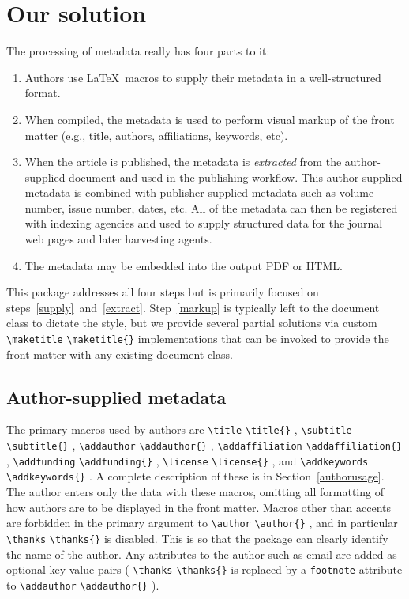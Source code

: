 \documentclass{article}
\newcommand{\cmd}[2][]{%
  \def\FirstArg{#1}%
  \ifx\FirstArg\empty%
    \texttt{\textbackslash{}#2}%
  \else%
    \texttt{\textbackslash{}#2\{#1\}}%
  \fi
}
\newcommand{\pkg}[1]{\texttt{#1}}
\begin{document}
\section{Our solution}
The processing of metadata really has four parts to it:
\begin{enumerate}
\item \label{supply}Authors use \LaTeX\ macros to supply their metadata in a well-structured format.
\item \label{markup}When compiled, the metadata is used to perform visual markup of
the front matter (e.g., title, authors, affiliations, keywords, etc).
\item \label{extract}When the article is published, the metadata is {\em extracted}
from the author-supplied document and used in the publishing workflow. This author-supplied
metadata is combined with publisher-supplied metadata such as volume number,
issue number, dates, etc.
All of the metadata can then be registered with indexing agencies and used to supply 
structured data for the journal web pages and later harvesting agents.
\item \label{xmp} The metadata may be embedded into the output PDF or HTML.
\end{enumerate}
This package addresses all four steps but is primarily focused on steps~\ref{supply}~and~\ref{extract}.
Step~\ref{markup} is typically left to the document class to dictate the style,
but we provide several partial solutions via custom \cmd{maketitle} implementations
that can be invoked to provide the front matter with any existing document class.

\subsection{Author-supplied metadata}
The primary macros used by authors are \cmd{title},
\cmd{subtitle}, \cmd{addauthor}, \cmd{addaffiliation},
\cmd{addfunding}, \cmd{license},
and \cmd{addkeywords}.  A complete description of these is in
Section~\ref{authorusage}. The author enters only the data with these
macros, omitting all formatting of how authors are to be displayed in
the front matter.  Macros other than accents are forbidden in the
primary argument to \cmd{author}, and in particular \cmd{thanks} is
disabled. This is so that the package can clearly identify the name of
the author. Any attributes to the author such as email are added as
optional key-value pairs (\cmd{thanks} is replaced by a \pkg{footnote}
attribute to \cmd{addauthor}).
\end{document}
